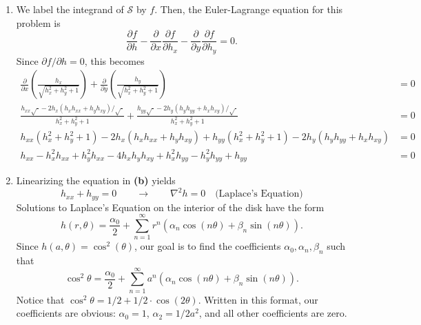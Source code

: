 \documentclass[10pt,letterpaper]{report}
\newcommand{\pp}[2]{\frac{\partial{#1}}{\partial{#2}}}
\begin{document}
\begin{enumerate}
\begin{enumerate}
    \item We label the integrand of $\mathcal S$ by $f$. Then, the Euler-Lagrange equation for this problem is
    \[
    \pp{f}{h} - \frac{\partial}{\partial x} \pp{f}{h_x} - \frac{\partial}{\partial y} \pp{f}{h_y} = 0.
    \]
    Since $\partial f/\partial h = 0$, this becomes
    \begin{align*}
        \frac{\partial}{\partial x} \left(\frac{h_x}{\sqrt{h_x^2 + h_y^2 + 1}}\right) +  \frac{\partial}{\partial y} \left(\frac{h_y}{\sqrt{h_x^2 + h_y^2 + 1}}\right)
        &= 0
        \\
        \frac{h_{xx} \sqrt{\cdot} - 2h_x(h_xh_{xx} + h_yh_{xy})/\sqrt{\cdot} }{h_x^2 + h_y^2 + 1} 
        + 
        \frac{h_{yy} \sqrt{\cdot} - 2h_y(h_yh_{yy} + h_xh_{xy})/\sqrt{\cdot} }{h_x^2 + h_y^2 + 1}
        &= 0
        \\
        h_{xx} (h_x^2 + h_y^2 + 1) - 2h_x(h_xh_{xx} + h_yh_{xy})
        + 
        h_{yy} (h_x^2 + h_y^2 + 1) - 2h_y(h_yh_{yy} + h_xh_{xy})
        &= 0
        \\
        h_{xx} - h_x^2h_{xx} + h_y^2h_{xx} - 4h_xh_yh_{xy}
        + 
        h_x^2h_{yy} - h_y^2h_{yy} + h_{yy}
        &= 0
    \end{align*}
    \item Linearizing the equation in \textbf{(b)} yields
    \[
    h_{xx} + h_{yy} = 0 \qquad \rightarrow \qquad \nabla^2 h = 0 \quad \textrm{(Laplace's Equation)}
    \]
    Solutions to Laplace's Equation on the interior of the disk have the form
    \[
    h(r,\theta) = \frac{\alpha_0}{2} + \sum_{n=1}^\infty r^n \left(\alpha_n \cos(n\theta) + \beta_n \sin(n\theta)\right).
    \]
    Since $h(a, \theta) = \cos^2(\theta)$, our goal is to find the coefficients $\alpha_0, \alpha_n, \beta_n$ such that
    \[
    \cos^2\theta = \frac{\alpha_0}{2} + \sum_{n=1}^\infty a^n \left(\alpha_n \cos(n\theta) + \beta_n \sin(n\theta)\right).
    \]
    Notice that $\cos^2\theta = 1/2 + 1/2\cdot \cos(2\theta)$. Written in this format, our coefficients are obvious: $\alpha_0 = 1$, $\alpha_2 = 1/2a^2$, and all other coefficients are zero.

\end{enumerate}
\end{enumerate}
\end{document}

